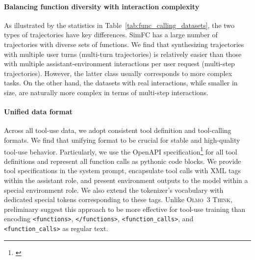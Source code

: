 \documentclass[table]{ai2style/ai2}
\newcommand{\olmothreethinking}{\textsc{Olmo~3 Think}\xspace}
\begin{document}
{{\paragraph{Balancing function diversity with interaction complexity} As illustrated by the statistics in Table~\ref{tab:func_calling_datasets}, the two types of trajectories have key differences. SimFC has a large number of trajectories with diverse sets of functions. 
We find that synthesizing trajectories with multiple user turns (multi-turn trajectories) is relatively easier than those with multiple assistant-environment interactions per user request (multi-step trajectories). 
However, the latter class usually corresponds to more complex tasks.  
On the other hand, the datasets with real interactions, while smaller in size, are naturally more complex in terms of multi-step interactions.

\paragraph{Unified data format} Across all tool-use data, we adopt consistent tool definition and tool-calling formats. 
We find that unifying format to be crucial for stable and high-quality tool-use behavior. 
Particularly, we use the OpenAPI specification\footnote{\href{https://swagger.io/specification/}{}} for all tool definitions and represent all function calls as pythonic code blocks. 
We provide tool specifications in the system prompt, encapsulate tool calls with XML tags within the assistant role, and present environment outputs to the model within a special environment role. 
We also extend the tokenizer's vocabulary with dedicated special tokens corresponding to these tags. 
Unlike \olmothreethinking, preliminary suggest this approach to be more effective for tool-use training than encoding \texttt{<functions>}, \texttt{</functions>}, \texttt{<function\_calls>}, and \texttt{<function\_calls>} as regular  text.

}}
\end{document}

